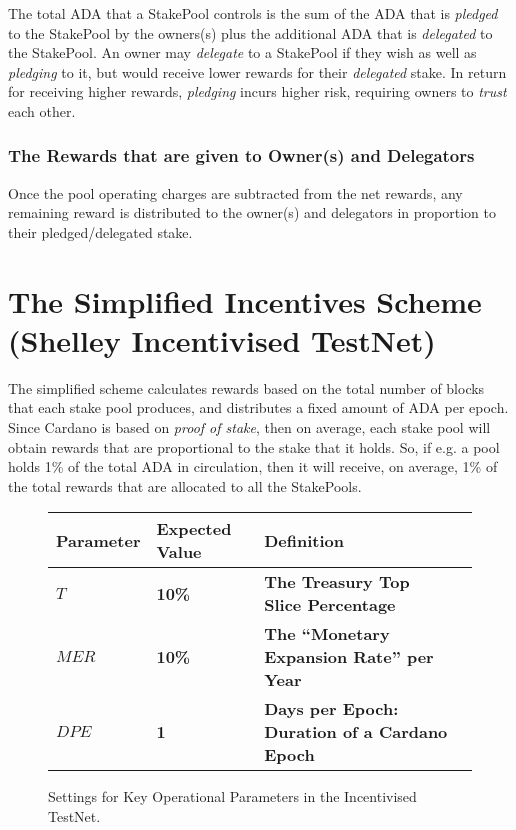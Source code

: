 \documentclass[11pt,a4paper,dvipsnames,twosided,final]{article}
\newcommand{\ada}{ADA{}}
\newcommand{\cardano}[1]{Cardano}
\begin{document}
\noindent
The total \ada{} that a StakePool controls is the sum of the \ada{} that is \emph{pledged} to the StakePool by the owners(s) plus
the additional \ada{} that is \emph{delegated} to the StakePool.  An owner may \emph{delegate} to a StakePool if
they wish as well as \emph{pledging} to it, but would receive lower rewards for their \emph{delegated} stake.
In return for receiving higher rewards, \emph{pledging} incurs higher risk, requiring owners to \emph{trust} each other.


\subsubsection*{The Rewards that are given to Owner(s) and Delegators}

Once the pool operating charges are subtracted from the net rewards, any remaining reward is distributed to the owner(s) and delegators
in proportion to their pledged/delegated stake.  %


\clearpage
\section{The Simplified Incentives Scheme (Shelley Incentivised TestNet)}
\label{sec:TestNet}

The simplified scheme calculates rewards based on the total number of blocks that each stake pool produces,
and distributes a fixed amount of \ada{} per epoch.
Since \cardano{} is based on \emph{proof of stake}, then on average, each stake pool will obtain
rewards that are proportional to the stake that it holds.  So, if e.g. a pool holds 1\% of the total
\ada{} in circulation, then it will receive, on average, 1\% of the total rewards that are allocated to all the
StakePools.

\begin{figure}[h!]
\begin{center}
\begin{tabular}{||l|l|p{10cm}|l||}
  \hline \hline
\textbf{Parameter} & \textbf{Expected Value} & \textbf{Definition} \\\hline
\textbf{\color{green} $T$} & \textbf{\color{green} 10\%} & \textbf{\color{green} The Treasury Top Slice Percentage} \\\hline
\textbf{\color{green} $\textit{MER}$} & \textbf{\color{green} 10\%}&  \textbf{\color{green} The ``Monetary Expansion Rate'' per Year}\\\hline
\textbf{\color{green} $\textit{DPE}$} & \textbf{\color{green} 1} & \textbf{\color{green}  Days per Epoch: Duration of a \cardano{} Epoch} \\\hline
  \hline
\end{tabular}
\end{center}
\caption{Settings for Key Operational Parameters in the Incentivised TestNet.}
\end{figure}
\end{document}
